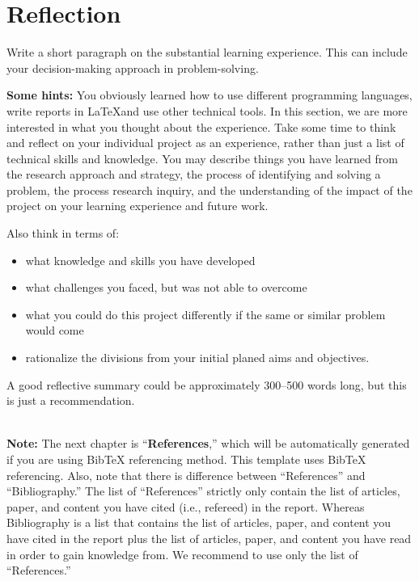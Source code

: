 \chapter{   Reflection}
\label{ch:reflection}
Write a short paragraph on the substantial learning experience. This can include your decision-making approach in problem-solving.

\textbf{Some hints:} You obviously learned how to use different programming languages, write reports in \LaTeX and use other technical tools. In this section, we are more interested in what you thought about the experience. Take some time to think and reflect on your individual project as an experience, rather than just a list of technical skills and knowledge. You may describe things you have learned from the research approach and strategy, the process of identifying and solving a problem, the process research inquiry, and the understanding of the impact of the project on your learning experience and future work.

Also think in terms of:
\begin{itemize}
    \item what knowledge and skills you have developed
    \item what challenges you faced, but was not able to overcome
    \item what you could do this project differently if the same or similar problem would come
    \item rationalize the divisions from your initial planed aims and objectives.
\end{itemize}


A good reflective summary could be approximately 300--500 words long, but this is just a recommendation.

~\\[2em]
\noindent
{\huge \textbf{Note:}} The next chapter is ``\textbf{References},'' which will be automatically generated if you are using BibTeX referencing method. This template uses BibTeX referencing.  Also, note that there is difference between ``References'' and ``Bibliography.'' The list of ``References'' strictly only contain the list of articles, paper, and content you have cited (i.e., refereed) in the report. Whereas Bibliography is a list that contains the list of articles, paper, and content you have cited in the report plus the list of articles, paper, and content you have read in order to gain knowledge from. We recommend to use only the list of ``References.'' 
